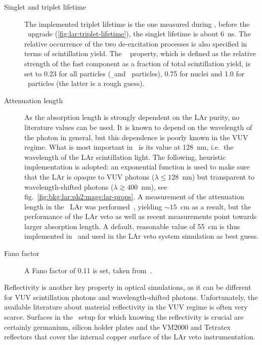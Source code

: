 \begin{description}
  \item[Singlet and triplet lifetime] \sloppy The implemented triplet lifetime is the one
    measured during \gerdatwo, before the \phasetwop\ upgrade
    (\cref{fig:lar:triplet-lifetime}), the singlet lifetime is about 6~ns. The relative
    occurrence of the two de-excitation processes is also specified in terms of
    scintillation yield. The \geant\  property, which is defined as the
    relative strength of the fast component as a fraction of total scintillation yield, is
    set to 0.23 for all particles (\b\ and \g\ particles), 0.75 for nuclei and 1.0 for \a\
    particles (the latter is a rough guess).

  \item[Attenuation length] As the absorption length is strongly dependent on the LAr
    purity, no literature values can be used. It is known to depend on the wavelength of
    the photon in general, but this dependence is poorly known in the VUV regime. What is
    most important in \mage\ is its value at 128~nm, i.e.~the wavelength of the LAr
    scintillation light. The following, heuristic implementation is adopted: an
    exponential function is used to make sure that the LAr is opaque to VUV photons
    ($\lambda \leq 128$~nm) but transparent to wavelength-shifted photons ($\lambda
    \gtrsim 400$~nm), see fig.~\ref{fig:bkg:lar:ph2:mage:lar-props}. A measurement of the
    attenuation length in the \gerda\ LAr was performed~\cite{Barros2020}, yielding
    $\sim15$~cm as a result, but the performance of the LAr veto as well as recent
    measurements point towards larger absorption length. A default, reasonable value of
    55~cm is thus implemented in \mage\ and used in the LAr veto system simulation as
    best guess.

  \item[Fano factor] A Fano factor of 0.11 is set, taken from~\cite{Doke1976}.

\end{description}

Reflectivity is another key property in optical simulations, as it can be different for
VUV scintillation photons and wavelength-shifted photons. Unfortunately, the available
literature about material reflectivity in the VUV regime is often very scarce. Surfaces
in the \gerda\ setup for which knowing the reflectivity is crucial are certainly
germanium, silicon holder plates and the VM2000 and Tetratex\reg{} reflectors that cover
the internal copper surface of the LAr veto instrumentation.

